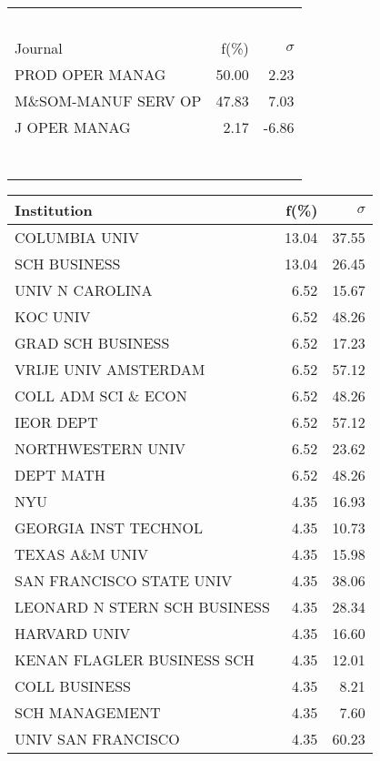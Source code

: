 \documentclass[a4paper,11pt]{report}
\begin{document}
\begin{landscape}
\begin{table}[!ht]
{\begin{tabular}{|l r r|}
 &  & \\
 &  & \\
 &  & \\
 &  & \\
 &  & \\
\hline
\hline
Journal & f(\%) & $\sigma$\\
\hline
PROD OPER MANAG & 50.00 & 2.23\\
M\&SOM-MANUF SERV OP & 47.83 & 7.03\\
J OPER MANAG & 2.17 & -6.86\\
 &  & \\
 &  & \\
 &  & \\
 &  & \\
 &  & \\
 &  & \\
 &  & \\
\hline
\end{tabular}
}
{\scriptsize\begin{tabular}{|l r r|}
\hline
Institution & f(\%) & $\sigma$\\
\hline
COLUMBIA UNIV & 13.04 & 37.55\\
SCH BUSINESS & 13.04 & 26.45\\
UNIV N CAROLINA & 6.52 & 15.67\\
KOC UNIV & 6.52 & 48.26\\
GRAD SCH BUSINESS & 6.52 & 17.23\\
VRIJE UNIV AMSTERDAM & 6.52 & 57.12\\
COLL ADM SCI \& ECON & 6.52 & 48.26\\
IEOR DEPT & 6.52 & 57.12\\
NORTHWESTERN UNIV & 6.52 & 23.62\\
DEPT MATH & 6.52 & 48.26\\
NYU & 4.35 & 16.93\\
GEORGIA INST TECHNOL & 4.35 & 10.73\\
TEXAS A\&M UNIV & 4.35 & 15.98\\
SAN FRANCISCO STATE UNIV & 4.35 & 38.06\\
LEONARD N STERN SCH BUSINESS & 4.35 & 28.34\\
HARVARD UNIV & 4.35 & 16.60\\
KENAN FLAGLER BUSINESS SCH & 4.35 & 12.01\\
COLL BUSINESS & 4.35 & 8.21\\
SCH MANAGEMENT & 4.35 & 7.60\\
UNIV SAN FRANCISCO & 4.35 & 60.23\\
\hline

\end{tabular}}
\end{table}
\end{landscape}
\end{document}
